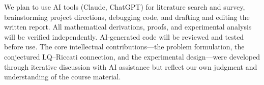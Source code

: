 \documentclass[letterpaper, 10 pt, conference]{ieeeconf}  %
\begin{document}
We plan to use AI tools (Claude, ChatGPT) for literature search and survey, brainstorming project directions, debugging code, and drafting and editing the written report. All mathematical derivations, proofs, and experimental analysis will be verified independently. AI-generated code will be reviewed and tested before use. The core intellectual contributions---the problem formulation, the conjectured LQ--Riccati connection, and the experimental design---were developed through iterative discussion with AI assistance but reflect our own judgment and understanding of the course material.

\nocite{*} %

\end{document}
